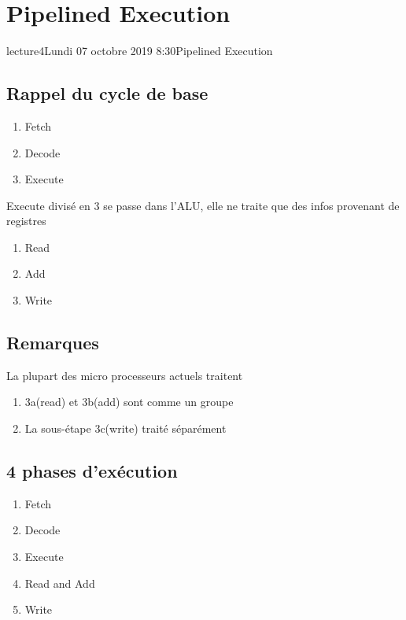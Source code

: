 \chapter{Pipelined Execution}
lecture{4}{Lundi 07 octobre 2019 8:30}{Pipelined Execution}
\section{Rappel du cycle de base}
\begin{enumerate}
  \item Fetch 
  \item Decode
  \item Execute
\end{enumerate}
Execute divisé en 3 se passe dans l'ALU, elle ne traite que des infos provenant de registres
\begin{enumerate}
  \item Read 
  \item Add 
  \item Write
\end{enumerate}

\section{Remarques}
La plupart des micro processeurs actuels traitent
\begin{enumerate}
  \item 3a(read) et 3b(add) sont comme un groupe
  \item La sous-étape 3c(write) traité séparément
\end{enumerate}

\section{4 phases d'exécution}
\begin{enumerate}
  \item Fetch
  \item Decode
  \item Execute
  \item Read and Add
  \item Write
\end{enumerate}

